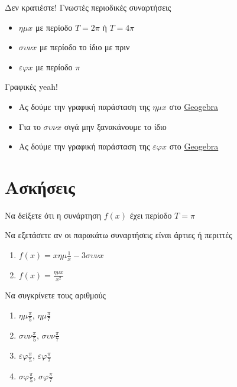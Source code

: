 \documentclass{../presentation}
\begin{document}
\begin{frame}{Δεν κρατιέστε!}
  Γνωστές περιοδικές συναρτήσεις
  \begin{itemize}
    \item<1-> $ημx$ με περίοδο  $Τ=2π$  ή $Τ=4π$
    \item<4-> $συνx$ με περίοδο  το ίδιο με πριν
    \item<6-> $εφx$ με περίοδο  $π$
  \end{itemize}
\end{frame}

\begin{frame}{Γραφικές yeah!}
  \begin{itemize}
    \item<1-> Ας δούμε την γραφική παράσταση της $ημx$ στο \href{https://www.geogebra.org/m/jvvwgvru}{Geogebra}
    \item<2-> Για το $συνx$ σιγά μην ξανακάνουμε το ίδιο
    \item<3-> Ας δούμε την γραφική παράσταση της $εφx$ στο \href{https://www.geogebra.org/m/qmk7cmh2}{Geogebra}
  \end{itemize}
\end{frame}

\section{Ασκήσεις}
\begin{askisi}
  Να δείξετε ότι η συνάρτηση $f(x)$ έχει περίοδο $Τ=π$
\end{askisi}

\begin{askisi}
  Να εξετάσετε αν οι παρακάτω συναρτήσεις είναι άρτιες ή περιττές
  \begin{enumerate}
    \item<1-> $f(x)=xημ\frac{1}{x}-3συνx$
    \item<2-> $f(x)=\frac{ημx}{x^2}$
  \end{enumerate}
\end{askisi}

\begin{askisi}
  Να συγκρίνετε τους αριθμούς
  \begin{enumerate}
    \item<1-> $ημ\frac{π}{5}$, $ημ\frac{π}{7}$
    \item<2-> $συν\frac{π}{5}$, $συν\frac{π}{7}$
    \item<3-> $εφ\frac{π}{5}$, $εφ\frac{π}{7}$
    \item<4-> $σφ\frac{π}{5}$, $σφ\frac{π}{7}$
  \end{enumerate}
\end{askisi}
\end{document}
